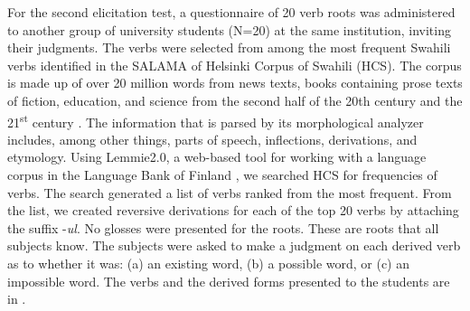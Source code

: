 \documentclass[output=paper]{langsci/langscibook}
\begin{document}
For the second elicitation test, a questionnaire of 20 verb roots was administered to another group of university students (N=20) at the same institution, inviting their judgments. The verbs were selected from among the most frequent Swahili verbs identified in the SALAMA of Helsinki Corpus of Swahili (HCS). The corpus is made up of over 20 million words from news texts, books containing prose texts of fiction, education, and science from the second half of the 20th century and the 21\textsuperscript{st} century \citep{Hurskainen2008,Hurskainen2009}. The information that is parsed by its morphological analyzer includes, among other things, parts of speech, inflections, derivations, and etymology. Using Lemmie2.0, a web-based tool for working with a language corpus in the Language Bank of Finland \citep{CSC2003}, we searched HCS for frequencies of verbs. The search generated a list of verbs ranked from the most frequent. From the list, we created reversive derivations for each of the top 20 verbs by attaching the suffix -\textit{ul}. No glosses were presented for the roots. These are roots that all subjects know. The subjects were asked to make a judgment on each derived verb as to whether it was: (a) an existing word, (b) a possible word, or (c) an impossible word. The verbs and the derived forms presented to the students are in .
\end{document}
